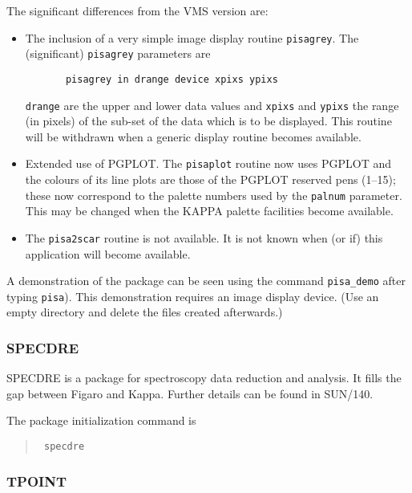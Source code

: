 The significant differences from the VMS version are:
\begin{itemize}
\item The inclusion of a very simple image display routine {\tt pisagrey}.
       The (significant) {\tt pisagrey} parameters are
\begin{verbatim}
       pisagrey in drange device xpixs ypixs
\end{verbatim}
       {\tt drange} are the upper and lower data values and {\tt xpixs} and 
       {\tt ypixs}
       the range (in pixels) of the sub-set of the data which is to be
       displayed. This routine will be withdrawn when a generic
       display routine becomes available.

\item Extended use of PGPLOT. The {\tt pisaplot} routine now uses PGPLOT and
       the colours of its line plots are those of the PGPLOT reserved
       pens (1--15); these now correspond to the palette numbers
       used by the {\tt palnum} parameter. This may be changed when the KAPPA
       palette facilities become available.

\item The {\tt pisa2scar} routine is not available. It is not known when
       (or if) this application will become available.

\end{itemize}


A demonstration of the package can be seen using the command 
{\tt pisa\_demo} after typing {\tt pisa}). 
This demonstration requires an image display device.  
(Use an empty directory and delete the files created afterwards.)

\subsubsection{SPECDRE}

SPECDRE is a package for spectroscopy data reduction and analysis.
It fills the gap between Figaro and Kappa. Further details can be
found in SUN/140. 

The package initialization command is 

\begin{quote}\tt
specdre
\end{quote}


\subsubsection{TPOINT}

